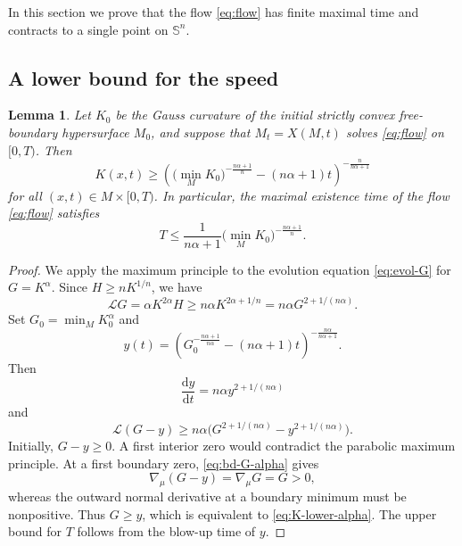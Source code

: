 \documentclass[11pt, reqno]{amsart}
\newtheorem{lemma}[theorem]{Lemma}
\theoremstyle{remark}
\theoremstyle{definition}
\numberwithin{equation}{section}
\newcommand{\cL}{\mathcal L}
\begin{document}
In this section we prove that the flow \eqref{eq:flow} has finite maximal time and contracts to a single point on $\mathbb{S}^n$.

\subsection{A lower bound for the speed}
\begin{lemma}\label{lem:K-lower-alpha}
Let $K_0$ be the Gauss curvature of the initial strictly convex free-boundary hypersurface $M_0$, and suppose that $M_t=X(M,t)$ solves \eqref{eq:flow} on $[0,T)$.  Then
\begin{equation}\label{eq:K-lower-alpha}
        K(x,t)\ge
        \left(\big(\min_MK_0\big)^{-\frac{n\alpha+1}{n}}-(n\alpha+1)t\right)^{-\frac{n}{n\alpha+1}}
\end{equation}
for all $(x,t)\in M\times [0,T)$.  In particular, the maximal existence time of the flow \eqref{eq:flow} satisfies
\begin{equation*}
        T\le \frac1{n\alpha+1}\big(\min_MK_0\big)^{-\frac{n\alpha+1}{n}}.
\end{equation*}
\end{lemma}

\begin{proof}
We apply the maximum principle to the evolution equation \eqref{eq:evol-G} for $G=K^\alpha$.  Since $H\geq nK^{1/n}$, we have
\begin{equation*}
        \cL G=\alpha K^{2\alpha}H\ge n\alpha K^{2\alpha+1/n}
        =n\alpha G^{2+1/(n\alpha)}.
\end{equation*}
Set $G_0=\min_MK_0^\alpha$ and
\begin{equation*}
        y(t)=\left(G_0^{-\frac{n\alpha+1}{n\alpha}}-(n\alpha+1)t\right)^{-\frac{n\alpha}{n\alpha+1}}.
\end{equation*}
Then
\begin{equation*}
  \dfrac{\mathrm{d}y}{\mathrm{d}t}=n\alpha y^{2+1/(n\alpha)}
\end{equation*}
and 
\begin{equation*}
        \mathcal{L}(G-y)\ge n\alpha\big(G^{2+1/(n\alpha)}-y^{2+1/(n\alpha)}\big).
\end{equation*}
Initially, $G-y\ge0$. A first interior zero would contradict the parabolic maximum principle. At a first boundary zero, \eqref{eq:bd-G-alpha} gives
\begin{equation*}
        \nabla_\mu(G-y)=\nabla_\mu G=G>0,
\end{equation*}
whereas the outward normal derivative at a boundary minimum must be nonpositive. Thus $G\ge y$, which is equivalent to \eqref{eq:K-lower-alpha}.  The upper bound for $T$ follows from the blow-up time of $y$.
\end{proof}
\end{document}
